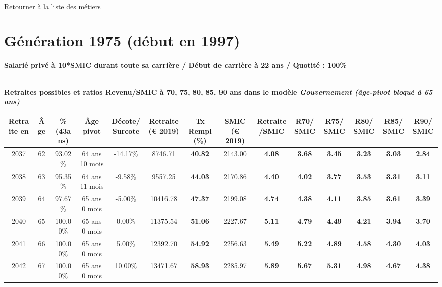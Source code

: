 

   
 \localtableofcontents 

~\\ 
 
 \hyperlink{page.2}{\noindent Retourner à la liste des métiers}

 \newpage 

\section{Génération 1975 (début en 1997)\label{10SMIC_100_1975_22_0}} 
 
{\bf \noindent Salarié privé à 10*SMIC durant toute sa carrière / Début de carrière à 22 ans / Quotité : 100\%}  ~ 

 ~\\{\bf \noindent Retraites possibles et ratios Revenu/SMIC à 70, 75, 80, 85, 90 ans dans le modèle \emph{Gouvernement (âge-pivot bloqué à 65 ans)}}  
 
\begin{adjustbox}{max width=\textwidth} 
\begin{tabular}[htb]{|c|c||c|c|c||c|c||c|c||c|c|c|c|c|} 
\hline 
 Retraite en &  Âge &  \%(43ans) &  Âge pivot &  Décote/Surcote &  Retraite (\euro{} 2019) &  Tx Rempl(\%) &  SMIC (\euro{} 2019) &  Retraite/SMIC &  R70/SMIC &  R75/SMIC &  R80/SMIC &  R85/SMIC &  R90/SMIC \\ 
\hline \hline 
 2037 &  62 &  93.02\% &  64 ans 10 mois &  -14.17\% &  8746.71 &  {\bf 40.82} &  2143.00 &  {\bf 4.08} &  {\bf 3.68} &  {\bf 3.45} &  {\bf 3.23} &  {\bf 3.03} &  {\bf 2.84} \\ 
\hline 
 2038 &  63 &  95.35\% &  64 ans 11 mois &  -9.58\% &  9557.25 &  {\bf 44.03} &  2170.86 &  {\bf 4.40} &  {\bf 4.02} &  {\bf 3.77} &  {\bf 3.53} &  {\bf 3.31} &  {\bf 3.11} \\ 
\hline 
 2039 &  64 &  97.67\% &  65 ans 0 mois &  -5.00\% &  10416.78 &  {\bf 47.37} &  2199.08 &  {\bf 4.74} &  {\bf 4.38} &  {\bf 4.11} &  {\bf 3.85} &  {\bf 3.61} &  {\bf 3.39} \\ 
\hline 
 2040 &  65 &  100.00\% &  65 ans 0 mois &  0.00\% &  11375.54 &  {\bf 51.06} &  2227.67 &  {\bf 5.11} &  {\bf 4.79} &  {\bf 4.49} &  {\bf 4.21} &  {\bf 3.94} &  {\bf 3.70} \\ 
\hline 
 2041 &  66 &  100.00\% &  65 ans 0 mois &  5.00\% &  12392.70 &  {\bf 54.92} &  2256.63 &  {\bf 5.49} &  {\bf 5.22} &  {\bf 4.89} &  {\bf 4.58} &  {\bf 4.30} &  {\bf 4.03} \\ 
\hline 
 2042 &  67 &  100.00\% &  65 ans 0 mois &  10.00\% &  13471.67 &  {\bf 58.93} &  2285.97 &  {\bf 5.89} &  {\bf 5.67} &  {\bf 5.31} &  {\bf 4.98} &  {\bf 4.67} &  {\bf 4.38} \\ 
\hline 
\hline 
\end{tabular} 
\end{adjustbox} 
 
